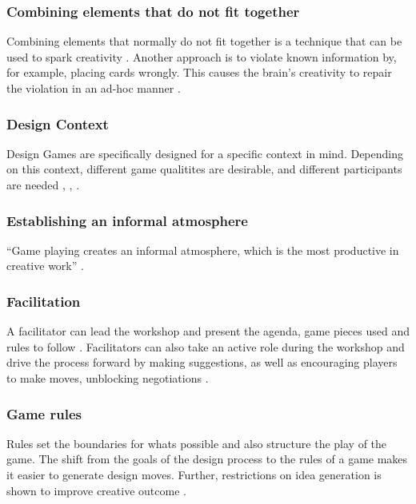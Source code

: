 \documentclass[draft,twoside]{vutinfth}
\begin{document}
            \subsubsection{Combining elements that do not fit together}
            Combining elements that normally do not fit together is a technique that can be used to spark creativity \cite{brandtDesigningExploratoryDesign2006}. 
            Another approach is to violate known information by, for example, placing cards wrongly. This causes the brain's 
            creativity to repair the violation in an ad-hoc manner \cite{royCardbasedDesignTools2019}. 
            
            \subsubsection{Design Context}
            Design Games are specifically designed for a specific context in mind. Depending on this context, 
            different game qualitites are desirable, and different participants are needed \cite{vaajakallioDesignGamesCodesign2014}, 
            \cite{gudiksenExplicatingStakeholderCriteria2017}, \cite{fikarGroundedTheoryZur2023}. 

            \subsubsection{Establishing an informal atmosphere}
            ``Game playing creates an informal atmosphere, which is the most productive in creative work'' 
            \cite{brandtDesigningExploratoryDesign2006}. 
            
            \subsubsection{Facilitation}
            A facilitator can lead the workshop and present the agenda, game pieces used and rules to follow \cite{eriksenTakingDesignGames2014}. 
            Facilitators can also take an active role during the workshop and drive the process forward by making suggestions, 
            as well as encouraging players to make moves, unblocking negotiations \cite{brandtFacilitatingCollaborationDesign2004a}. 

            \subsubsection{Game rules}
            Rules set the boundaries for whats possible and also structure the play of the game. The shift from the goals 
            of the design process to the rules of a game makes it easier to generate design moves. Further, restrictions on 
            idea generation is shown to improve creative outcome \cite{brandtFacilitatingCollaborationDesign2004a}. 
\end{document}
